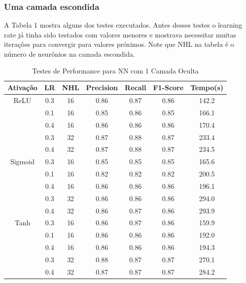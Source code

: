 \documentclass[conference]{IEEEtran}
\begin{document}
\subsubsection{Uma camada escondida}
	
	A Tabela 1 mostra alguns dos testes executados. Antes desses testes o learning rate já tinha sido testados com valores menores e mostrava necessitar muitas iterações para convergir para valores próximos. Note que NHL na tabela é o número de neurônios na camada escondida.
	
\begin{table}[h!]
 \begin{center}
  \caption{Testes de Performance para NN com 1 Camada Oculta}
  \label{table:table1}
  \begin{tabular}{ |c|c|c|c|c|c|c| }
   \hline
   Ativação & LR & NHL & Precision & Recall & F1-Score & Tempo(s)\\
   \hline
   ReLU & 0.3 & 16 & 0.86 & 0.87 & 0.86 & 142.2 \\ 
                   & 0.1 & 16 & 0.85 & 0.86 & 0.85 & 166.1 \\
                   & 0.4 & 16 & 0.86 & 0.86 & 0.86 & 170.4 \\
                   & 0.3 & 32 & 0.87 & 0.88 & 0.87 & 233.4 \\
                   & 0.4 & 32 & 0.87 & 0.88 & 0.87 & 234.5 \\
   \hline
   Sigmoid & 0.3 & 16 & 0.85 & 0.85 & 0.85 & 165.6 \\ 
                     & 0.1 & 16 & 0.82 & 0.82 & 0.82 & 200.5 \\
                     & 0.4 & 16 & 0.86 & 0.86 & 0.86 & 196.1 \\
                     & 0.3 & 32 & 0.86 & 0.86 & 0.86 & 294.0 \\
                     & 0.4 & 32 & 0.86 & 0.87 & 0.86 & 293.9 \\	
   \hline
   Tanh & 0.3 & 16 & 0.86 & 0.87 & 0.86 & 159.9 \\ 
                     & 0.1 & 16 & 0.86 & 0.86 & 0.86 & 192.0 \\
                     & 0.4 & 16 & 0.86 & 0.86 & 0.86 & 194.3 \\
                     & 0.3 & 32 & 0.88 & 0.87 & 0.87 & 270.1 \\
                     & 0.4 & 32 & 0.87 & 0.87 & 0.87 & 284.2 \\

 \hline
 \end{tabular}
 \end{center}
\end{table}
\end{document}

